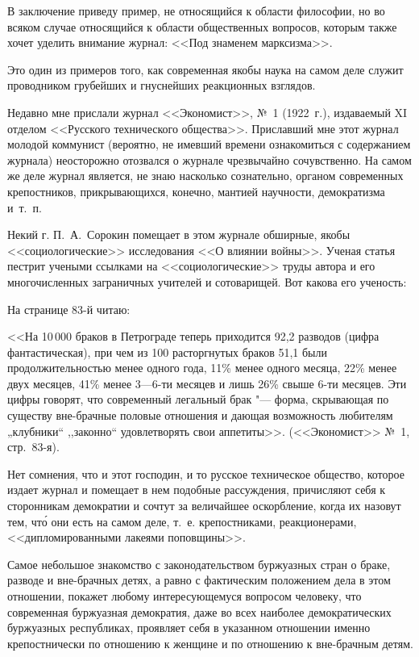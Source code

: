 В заключение приведу пример, не относящийся к области философии, но во
всяком случае относящийся к области общественных вопросов, которым также
хочет уделить внимание журнал: <<Под знаменем марксизма>>.

Это один из примеров того, как современная якобы наука на самом деле служит
проводником грубейших и гнуснейших реакционных взглядов.

Недавно мне прислали журнал <<Экономист>>, №~1 (1922~г.),
издаваемый XI отделом <<Русского технического общества>>. Приславший мне этот
журнал молодой коммунист (вероятно, не имевший времени ознакомиться с
содержанием журнала) неосторожно отозвался о журнале чрезвычайно
сочувственно. На самом же деле журнал является, не знаю насколько
сознательно, органом современных крепостников, прикрывающихся, конечно,
мантией научности, демократизма и~т.~п.

Некий г. П.~А.~Сорокин помещает в этом
журнале обширные, якобы <<социологические>> исследования <<О влиянии войны>>.
Ученая статья пестрит учеными ссылками на <<социологические>> труды автора и
его многочисленных заграничных учителей и сотоварищей. Вот какова его
ученость:

На странице 83-й читаю:

<<На 10\,000 браков в Петрограде теперь приходится 92,2 разводов (цифра
фантастическая), при чем из 100 расторгнутых браков 51,1 были
продолжительностью менее одного года, 11\% менее одного месяца, 22\% менее
двух месяцев, 41\% менее 3---6-ти месяцев и лишь 26\% свыше 6-ти месяцев.
Эти цифры говорят, что современный легальный брак "--- форма, скрывающая по
существу вне-брачные половые отношения и дающая возможность любителям
„клубники“ ,,законно`` удовлетворять свои аппетиты>>. (<<Экономист>>
№~1, стр.~83-я).

Нет сомнения, что и этот господин, и то русское техническое общество,
которое издает журнал и помещает в нем подобные рассуждения, причисляют
себя к сторонникам демократии и сочтут за величайшее оскорбление, когда их
назовут тем, чт\'{о} они есть на самом деле, т.~е. крепостниками,
реакционерами, <<дипломированными лакеями поповщины>>.

Самое небольшое знакомство с законодательством буржуазных стран о браке,
разводе и вне-брачных детях, а равно с фактическим положением дела в этом
отношении, покажет любому интересующемуся вопросом человеку, что
современная буржуазная демократия, даже во всех наиболее демократических
буржуазных республиках, проявляет себя в указанном отношении именно
крепостнически по отношению к женщине и по отношению к вне-брачным детям.

